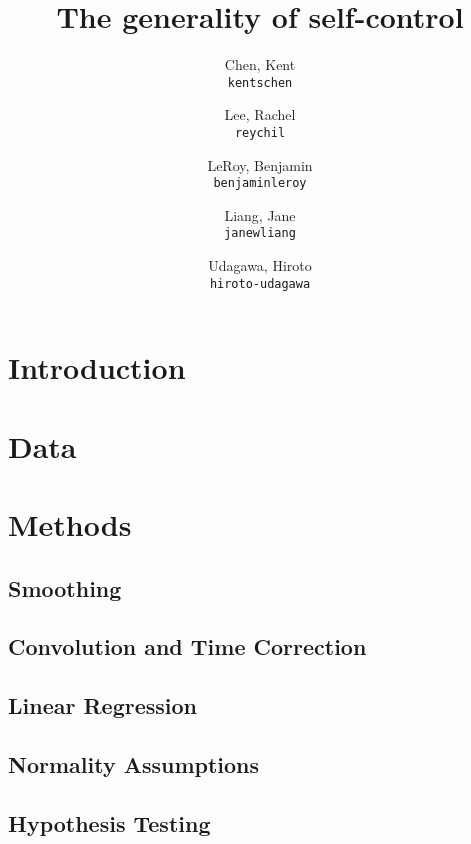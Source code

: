 \documentclass[11pt]{article}
\title{The generality of self-control}
\author{
  Chen, Kent\\
  \texttt{kentschen}
  \and
  Lee, Rachel\\
  \texttt{reychil}
  \and
  LeRoy, Benjamin\\
  \texttt{benjaminleroy}
  \and
  Liang, Jane\\
  \texttt{janewliang}
  \and
  Udagawa, Hiroto\\
  \texttt{hiroto-udagawa}
}
\begin{document}
\maketitle

\abstract{}

\section{Introduction} \label{introduction}
	

\section{Data} \label{data}

	
	
\section{Methods} \label{methods}
	\subsection{Smoothing}
	
		

	\subsection{Convolution and Time Correction}

		
		
	\subsection{Linear Regression}
	
		

	\subsection{Normality Assumptions}
	
		
		
	\subsection{Hypothesis Testing}
	
		
\end{document}
